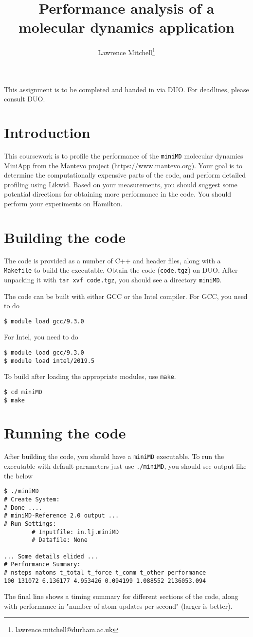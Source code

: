 \documentclass[a4paper]{article}
\title{Performance analysis of a molecular dynamics application}
\author{Lawrence Mitchell\thanks{lawrence.mitchell@durham.ac.uk}}
\begin{document}
\maketitle

This assignment is to be completed and handed in via DUO. 
For deadlines, please consult DUO.

\section{Introduction}
\label{sec:introduction}

This coursework is to profile the performance of the \texttt{miniMD}
molecular dynamics MiniApp from the Mantevo project
(\url{https://www.mantevo.org}). Your goal is to determine the
computationally expensive parts of the code, and perform detailed
profiling using Likwid. Based on your measurements, you should suggest
some potential directions for obtaining more performance in the code.
You should perform your experiments on Hamilton.

\section{Building the code}
\label{sec:build}

The code is provided as a number of C++ and header files, along with a
\texttt{Makefile} to build the executable. Obtain the code
(\texttt{code.tgz}) on DUO. After unpacking it with \texttt{tar xvf
  code.tgz}, you should see a directory \texttt{miniMD}.

The code can be built with either GCC or the Intel compiler. For GCC,
you need to do
\begin{verbatim}
$ module load gcc/9.3.0
\end{verbatim}
For Intel, you need to do
\begin{verbatim}
$ module load gcc/9.3.0
$ module load intel/2019.5
\end{verbatim}
To build after loading the appropriate modules, use \texttt{make}.
\begin{verbatim}
$ cd miniMD
$ make
\end{verbatim}

\section{Running the code}
\label{sec:run}
After building the code, you should have a \texttt{miniMD} executable.
To run the executable with default parameters just use
\texttt{./miniMD}, you should see output like the below
\begin{verbatim}
$ ./miniMD
# Create System:
# Done .... 
# miniMD-Reference 2.0 output ...
# Run Settings: 
        # Inputfile: in.lj.miniMD
        # Datafile: None

... Some details elided ...
# Performance Summary:
# nsteps natoms t_total t_force t_comm t_other performance
100 131072 6.136177 4.953426 0.094199 1.088552 2136053.094
\end{verbatim}
The final line shows a timing summary for different sections of the
code, along with performance in "number of atom updates per second"
(larger is better).
\end{document}
